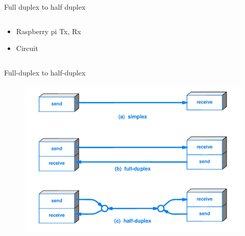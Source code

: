 \documentclass{beamer}
\begin{document}
\begin{frame}{Full duplex to half duplex}

    \begin{columns}
        \begin{column}[]{0.5\textwidth}
            \begin{itemize}
                \item Raspberry pi Tx, Rx
                \item Circuit
            \end{itemize}
        \end{column}
        
        
        \begin{column}[]{0.5\textwidth}
        \end{column}
    \end{columns}
    
\end{frame}



\begin{frame}{Full-duplex to half-duplex }

    \begin{figure}
        \centering
        \includegraphics[width = \textwidth]{img/BBE_Simplex vs Duplex_Transmissions.jpg}
        
    \end{figure}
    
\end{frame}


\end{document}
